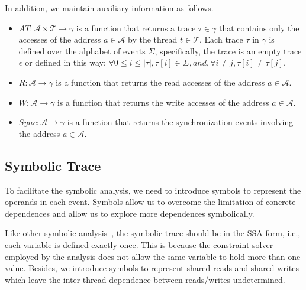 
In addition, we maintain auxiliary information as follows.
\begin{itemize}
\item $AT: \mathcal{A} \times \mathcal{T} \rightarrow \gamma$ is a function that returns a trace $\tau \in \gamma$ that contains only the accesses of the address $a \in \mathcal{A}$ by the thread $t\in \mathcal{T}$. Each trace $\tau$ in $\gamma$ is defined over the alphabet of events $\Sigma$, specifically, the trace is an empty trace $\epsilon$ or defined in this way:  $\forall 0\leq i\leq |\tau|,   \tau[i]\in \Sigma, and, \forall i\neq j, \tau[i]\neq \tau[j]$. 
\item $R: \mathcal{A} \rightarrow \gamma$ is a function that returns the read accesses of the address $a\in \mathcal{A}$.
\item $W: \mathcal{A} \rightarrow \gamma$ is a function that returns the write accesses of the address $a \in \mathcal{A}$.
\item $Sync: \mathcal{A} \rightarrow \gamma$ is a function that returns the synchronization events involving the address $a\in \mathcal{A}$. 
\end{itemize}


\subsection{Symbolic Trace}
To facilitate the symbolic analysis, we need to introduce symbols to represent the operands in each event. Symbols allow us to overcome the limitation of concrete dependences and allow us to explore more dependences symbolically. 











Like other symbolic analysis~\cite{jeff,chao}, the symbolic trace should be in the SSA form, i.e., each variable is defined exactly once. This is because the constraint solver employed by the analysis does not allow the same variable to hold more than one value.  Besides, we introduce symbols to represent shared reads and shared writes which leave the inter-thread dependence between reads/writes undetermined.























